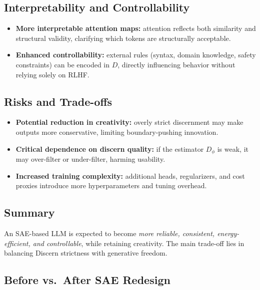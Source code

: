 \documentclass[11pt]{article}
\theoremstyle{plain}
\theoremstyle{definition}
\theoremstyle{remark}
\begin{document}
\subsection{Interpretability and Controllability}
\begin{itemize}
  \item \textbf{More interpretable attention maps:} attention reflects both similarity and structural validity, clarifying which tokens are structurally acceptable.
  \item \textbf{Enhanced controllability:} external rules (syntax, domain knowledge, safety constraints) can be encoded in $D$, directly influencing behavior without relying solely on RLHF.
\end{itemize}

\subsection{Risks and Trade-offs}
\begin{itemize}
  \item \textbf{Potential reduction in creativity:} overly strict discernment may make outputs more conservative, limiting boundary-pushing innovation.
  \item \textbf{Critical dependence on discern quality:} if the estimator $D_\phi$ is weak, it may over-filter or under-filter, harming usability.
  \item \textbf{Increased training complexity:} additional heads, regularizers, and cost proxies introduce more hyperparameters and tuning overhead.
\end{itemize}

\subsection{Summary}
An SAE-based LLM is expected to become \emph{more reliable, consistent, energy-efficient, and controllable}, while retaining creativity. The main trade-off lies in balancing Discern strictness with generative freedom.

\subsection{Before vs.\ After SAE Redesign}
\end{document}
